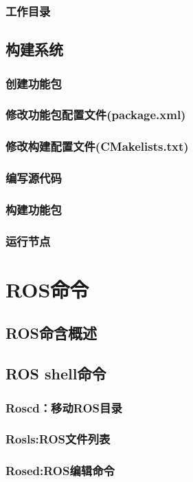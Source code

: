 \documentclass[geye,green,kindle,cn]{elegantnote}
\begin{document}
\subsubsection{工作目录}
\subsection{构建系统}
\subsubsection{创建功能包}
\subsubsection{修改功能包配置文件(package.xml)}
\subsubsection{修改构建配置文件(CMakelists.txt)}
\subsubsection{编写源代码}
\subsubsection{构建功能包}
\subsubsection{运行节点}
\section{ROS命令}
\subsection{ROS命含概述}
\subsection{ROS shell命令}
\subsubsection{Roscd：移动ROS目录}
\subsubsection{Rosls:ROS文件列表}
\subsubsection{Rosed:ROS编辑命令}
\end{document}
